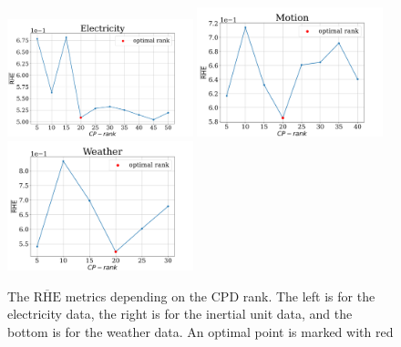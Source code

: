 \documentclass[referee, pdflatex, sn-mathphys-num]{sn-jnl}
\theoremstyle{definition}
\theoremstyle{plain}
\begin{document}
		\begin{figure}[h]
			\centering
			\includegraphics[width=0.48\textwidth, keepaspectratio]{RHE_mean_elec.png}
			\includegraphics[width=0.48\textwidth, keepaspectratio]{RHE_mean_motion.png}
			\includegraphics[width=0.48\textwidth, keepaspectratio]{RHE_mean_weather}
			\caption{The $ \overline{\text{RHE}} $ metrics depending on the CPD rank. The left is for the electricity data, the right is for the inertial unit data, and the bottom is for the weather data. An optimal point is marked with red}\label{fig:decomp_rhe_rank}
		\end{figure}

 
\end{document}
